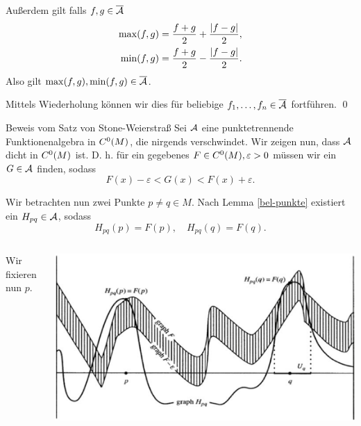 \begin{frame}
    Außerdem gilt falls \(f,g \in \overline{\mathcal{A}} \)
    \pause
    \begin{align*}
        \max(f,g) &= \frac{f+g}{2} + \frac{\left|f-g\right|}{2}, \\
        \min(f,g) &= \frac{f+g}{2} - \frac{\left|f-g\right|}{2}.
    \end{align*} 
    \pause
    Also gilt \( \max(f,g), \min(f,g) \in \overline{\mathcal{A}} \). 
    \pause

    Mittels Wiederholung können wir dies für beliebige 
    \( f_1, \ldots, f_n \in \overline{\mathcal{A}} \) fortführen.
    \qed
\end{frame}

\begin{frame}{Beweis vom Satz von Stone-Weierstraß}
    Sei \( \mathcal{A} \) eine punktetrennende Funktionenalgebra in \(C^0(M)\), die nirgends verschwindet. \pause
    Wir zeigen nun, dass \( \mathcal{A} \) dicht in \(C^0(M)\) ist. \pause
    D. h. für ein gegebenes \( F \in C^0(M), \varepsilon > 0 \) 
    müssen wir ein \( G \in \mathcal{A} \) finden, sodass 
    \[ F(x) - \varepsilon < G(x) < F(x) + \varepsilon. \]
    \pause

    Wir betrachten nun zwei Punkte \(p\neq q \in M\).
    Nach Lemma \ref{bel-punkte} existiert ein \(H_{pq} \in \mathcal{A}\), 
    sodass 
    \[ H_{pq}(p) = F(p), \quad H_{pq}(q) = F(q). \]
\end{frame}

\begin{frame}
    \begin{columns}
        \begin{column}{0.4\textwidth}
            Wir fixieren nun \(p\).
        \end{column}
        \begin{column}{0.6\textwidth}
            \includegraphics[width=\textwidth]{images/stone-weierstrass-step1.png}
        \end{column}
    \end{columns}
\end{frame}

